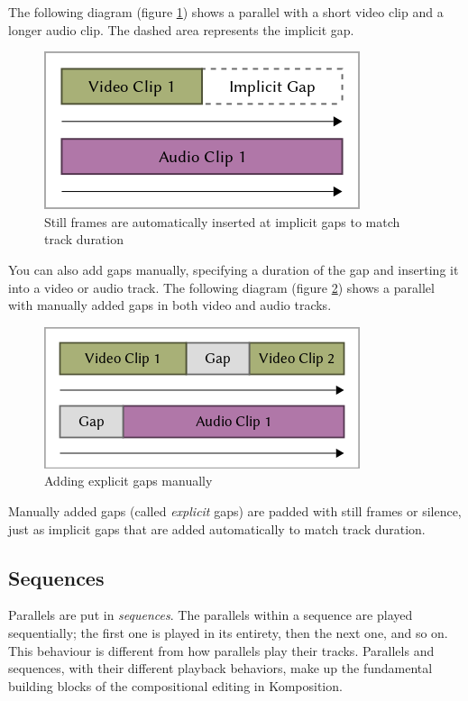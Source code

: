 The following diagram (figure \ref{fig:case1_2}) shows a parallel with a short video clip and a longer audio clip. The dashed area represents the implicit gap.
\begin{figure}[htbp]
 \centering
 \includegraphics[width=.95\linewidth]{./pics/case1_2.png}
 \caption{Still frames are automatically inserted at implicit gaps to match track duration}
 \label{fig:case1_2}
\end{figure}
You can also add gaps manually, specifying a duration of the gap and inserting it into a video or audio track. The following diagram (figure \ref{fig:case1_3}) shows a parallel with manually added gaps in both video and audio tracks.
\begin{figure}[htbp]
 \centering
 \includegraphics[width=.95\linewidth]{./pics/case1_3.png}
 \caption{Adding explicit gaps manually}
 \label{fig:case1_3}
\end{figure}
Manually added gaps (called \textit{explicit} gaps) are padded with still frames or silence, just as implicit gaps that are added automatically to match track duration.

\subsection{Sequences}

Parallels are put in \textit{sequences}. The parallels within a sequence are played sequentially; the first one is played in its entirety, then the next one, and so on. This behaviour is different from how parallels play their tracks. Parallels and sequences, with their different playback behaviors, make up the fundamental building blocks of the compositional editing in Komposition.


